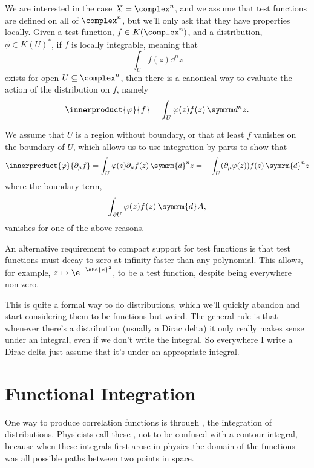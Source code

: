 \documentclass[fleqn]{NotesClass}
\renewcommand{\dd}[1]{\,\symrm{d}#1}
\begin{document}
    We are interested in the case \(X = \complex^n\), and we assume that test functions are defined on all of \(\complex^n\), but we'll only ask that they have properties locally.
    Given a test function, \(f \in K(\complex^n)\), and a distribution, \(\phi \in K(U)^*\), if \(f\) is locally integrable, meaning that
    \begin{equation}
        \int_U f(z) \dd^nz
    \end{equation}
    exists for open \(U \subseteq \complex^n\), then there is a canonical way to evaluate the action of the distribution on \(f\), namely
    \begin{equation}
        \innerproduct{\varphi}{f} = \int_U \varphi(z) f(z) \dd^nz.
    \end{equation}
    
    We assume that \(U\) is a region without boundary, or that at least \(f\) vanishes on the boundary of \(U\), which allows us to use integration by parts to show that
    \begin{equation}
        \innerproduct{\varphi}{\partial_\mu f} = \int_U \varphi(z) \partial_\mu f(z) \dd{^nz} = -\int_U (\partial_\mu \varphi(z)) f(z) \dd{^nz}
    \end{equation}
    where the boundary term,
    \begin{equation}
        \int_{\partial U} \varphi(z)f(z) \dd{A},
    \end{equation}
    vanishes for one of the above reasons.
    
    An alternative requirement to compact support for test functions is that test functions must decay to zero at infinity faster than any polynomial.
    This allows, for example, \(z \mapsto \e^{-\abs{z}^2}\), to be a test function, despite being everywhere non-zero.
    
    This is quite a formal way to do distributions, which we'll quickly abandon and start considering them to be functions-but-weird.
    The general rule is that whenever there's a distribution (usually a Dirac delta) it only really makes sense under an integral, even if we don't write the integral.
    So everywhere I write a Dirac delta just assume that it's under an appropriate integral.
    
    \section{Functional Integration}
    One way to produce correlation functions is through , the integration of distributions.
    Physicists call these , not to be confused with a contour integral, because when these integrals first arose in physics the domain of the functions was all possible paths between two points in space.
    
\end{document}
